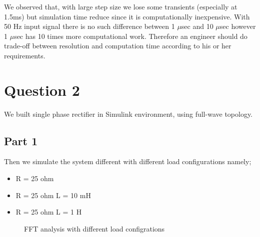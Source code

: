 \documentclass[fleqn, a4paper]{report}
\begin{document}
We observed that, with large step size we lose some transients (especially at 1.5ms) but simulation time reduce since it is computationally inexpensive. With 50 Hz input signal there is no such difference between 1 $\mu$sec and 10 $\mu$sec however 1 $\mu$sec has 10 times more computational work. Therefore an engineer should do trade-off between resolution and computation time according to his or her requirements.  
\section*{Question 2}
We built single phase rectifier in Simulink environment, using full-wave topology. 
\subsection*{Part 1}
Then we simulate the system different with different load configurations namely;
\begin{itemize}
	\item R = 25 ohm
	\item R = 25 ohm L = 10 mH
	\item R = 25 ohm L = 1 H
\end{itemize}
\begin{figure}[H]%
    \centering
    \qquad
    \qquad
    \caption{FFT analysis with different load configrations}%
    \label{fig:example}%
\end{figure}
\end{document}
